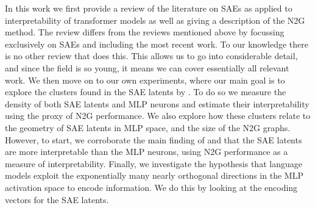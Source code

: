 In this work we first provide a review of the literature on \acp{SAE} as applied to interpretability of transformer models as well as giving a description of the \ac{N2G} method.
The review differs from the reviews mentioned above by focussing exclusively on \acp{SAE} and including the most recent work.
To our knowledge there is no other review that does this.
This allows us to go into considerable detail, and since the field is so young, it means we can cover essentially all relevant work.
We then move on to our own experiments, where our main goal is to explore the clusters found in the \ac{SAE} latents by \textcite{bricken_towards_2023}.
To do so we measure the density of both \ac{SAE} latents and \ac{MLP} neurons and estimate their interpretability using the proxy of \ac{N2G} performance.
We also explore how these clusters relate to the geometry of \ac{SAE} latents in \ac{MLP} space, and the size of the \ac{N2G} graphs.
However, to start, we corroborate the main finding of \textcite{bricken_towards_2023} and \textcite{cunningham_sparse_2023} that the \ac{SAE} latents are more interpretable than the \ac{MLP} neurons, using \ac{N2G} performance as a measure of interpretability.
Finally, we investigate the hypothesis that language models exploit the exponentially many nearly orthogonal directions in the \ac{MLP} activation space to encode information.
We do this by looking at the encoding vectors for the \ac{SAE} latents.
